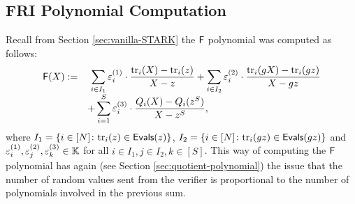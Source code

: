 \begin{example}
  
  
\end{example} 


\subsection{FRI Polynomial Computation}\label{sec:computing-polynomials}

Recall from Section \ref{sec:vanilla-STARK} the $\textsf{F}$ polynomial was computed as follows:
\begin{align*}
\begin{array}{rl}
\textsf{F}(X) := &\displaystyle~\sum_{i \in I_1} \varepsilon^{(1)}_i \cdot \frac{\text{tr}_i(X) - \text{tr}_i(z)}{X - z} + \sum_{i \in I_2} \varepsilon^{(2)}_i \cdot \frac{\text{tr}_i(gX) - \text{tr}_i(gz)}{X - gz} \\[0.2cm]
  &\displaystyle + \sum_{i=1}^S \varepsilon^{(3)}_i \cdot \frac{Q_i(X) - Q_i(z^S)}{X - z^S},
\end{array}
\end{align*}
where $I_1 = \{i \in [N] \colon \text{tr}_i(z) \in \textsf{Evals}(z)\}$, $I_2 = \{i \in [N] \colon \text{tr}_i(gz) \in \textsf{Evals}(gz)\}$ and $\varepsilon^{(1)}_i,\varepsilon^{(2)}_j,\varepsilon^{(3)}_k \in \mathbb{K}$ for all $i \in I_1,j\in I_2, k\in[S]$. This way of computing the $\textsf{F}$ polynomial has again (see Section \ref{sec:quotient-polynomial}) the issue that the number of random values sent from the verifier is proportional to the number of polynomials involved in the previous sum.

